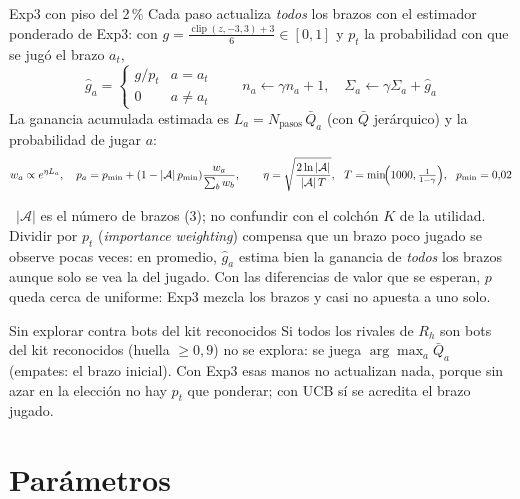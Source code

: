 \documentclass[10.5pt,a4paper]{article}
\newcommand{\uso}[1]{\par\smallskip{\labelfont\small\color{felt} Cómo usarla.}\ {\small #1}}
\let\oldsection\section
\renewcommand{\section}{\needspace{16\baselineskip}\oldsection}
\begin{document}
\begin{formbox}{Exp3 con piso del 2\,\%}
Cada paso actualiza \emph{todos} los brazos con el estimador ponderado de Exp3: con $g=\tfrac{\operatorname{clip}(z,-3,3)+3}{6}\in[0,1]$ y $p_t$ la probabilidad con que se jugó el brazo $a_t$,
\[
\hat g_a=\begin{cases}g/p_t & a=a_t\\ 0 & a\neq a_t\end{cases}\qquad n_a\leftarrow\gamma n_a+1,\quad \Sigma_a\leftarrow\gamma\Sigma_a+\hat g_a
\]
La ganancia acumulada estimada es $L_a=N_{\text{pasos}}\,\bar Q_a$ (con $\bar Q$ jerárquico) y la probabilidad de jugar $a$:
\[
w_a\propto e^{\eta L_a},\quad p_a=p_{\min}+(1-|\mathcal A|\,p_{\min})\frac{w_a}{\sum_b w_b},\qquad \eta=\sqrt{\frac{2\ln |\mathcal A|}{|\mathcal A|\,T}},\ \ T=\min\!\Bigl(1000,\tfrac{1}{1-\gamma}\Bigr),\ \ p_{\min}=0{,}02
\]
\uso{$|\mathcal A|$ es el número de brazos (3); no confundir con el colchón $K$ de la utilidad. Dividir por $p_t$ (\emph{importance weighting}) compensa que un brazo poco jugado se observe pocas veces: en promedio, $\hat g_a$ estima bien la ganancia de \emph{todos} los brazos aunque solo se vea la del jugado. Con las diferencias de valor que se esperan, $p$ queda cerca de uniforme: Exp3 mezcla los brazos y casi no apuesta a uno solo.}
\end{formbox}

\begin{formbox}{Sin explorar contra bots del kit reconocidos}
Si todos los rivales de $R_h$ son bots del kit reconocidos (huella $\ge 0{,}9$) no se explora: se juega $\arg\max_a\bar Q_a$ (empates: el brazo inicial). Con Exp3 esas manos no actualizan nada, porque sin azar en la elección no hay $p_t$ que ponderar; con UCB sí se acredita el brazo jugado.
\end{formbox}

\section{Parámetros}
\end{document}
